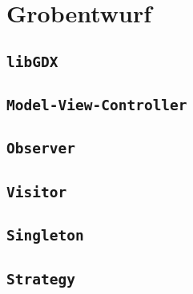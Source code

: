 \section{Grobentwurf}

\subsection{\texttt{libGDX}}

\subsection{\texttt{Model-View-Controller}}

\subsection{\texttt{Observer}}

\subsection{\texttt{Visitor}}

\subsection{\texttt{Singleton}}

\subsection{\texttt{Strategy}}
